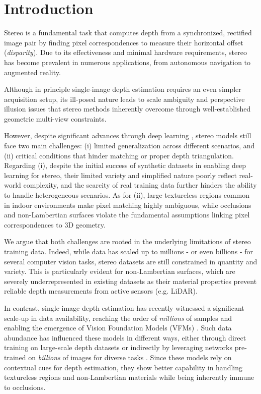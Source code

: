 \section{Introduction}
\label{sec:intro}

Stereo is a fundamental task that computes depth from a synchronized, rectified image pair by finding pixel correspondences to measure their horizontal offset (\textit{disparity}). Due to its effectiveness and minimal hardware requirements, stereo has become prevalent in numerous applications, from autonomous navigation to augmented reality.

Although in principle single-image depth estimation \cite{arampatzakis2023monocular} requires an even simpler acquisition setup, its ill-posed nature leads to scale ambiguity and perspective illusion issues that stereo methods inherently overcome through well-established geometric multi-view constraints.

However, despite significant advances through deep learning \cite{laga2020survey,poggi2021synergies}, stereo models still face two main challenges: (i) limited generalization across different scenarios, and (ii) critical conditions that hinder matching or proper depth triangulation.
Regarding (i), despite the initial success of synthetic datasets in enabling deep learning for stereo, their limited variety and simplified nature poorly reflect real-world complexity, and the scarcity of real training data further hinders the ability to handle heterogeneous scenarios. As for (ii), large textureless regions common in indoor environments make pixel matching highly ambiguous, while occlusions and non-Lambertian surfaces \cite{zamaramirez2022booster,zamaramirez2024booster,wen2024layeredflow} violate the fundamental assumptions linking pixel correspondences to 3D geometry.

We argue that both challenges are rooted in the underlying limitations of stereo training data. Indeed, while data has scaled up to millions - or even billions - for several computer vision tasks, stereo datasets are still constrained in quantity and variety. 
This is particularly evident for non-Lambertian surfaces, which are severely underrepresented in existing datasets as their material properties prevent reliable depth measurements from active sensors (e.g. LiDAR).


In contrast, single-image depth estimation has recently witnessed a significant scale-up in data availability, reaching the order of \textit{millions} of samples and enabling the emergence of Vision Foundation Models (VFMs) \cite{depth_anything_v1,depth_anything_v2,ke2023repurposing,fu2024geowizard}. Such data abundance has influenced these models in different ways, either through direct training on large-scale depth datasets  \cite{depth_anything_v1,depth_anything_v2} or indirectly by leveraging networks pre-trained on \textit{billions} of images for diverse tasks \cite{ke2023repurposing,fu2024geowizard}. 
Since these models rely on contextual cues for depth estimation, they show better capability in handling textureless regions and non-Lambertian materials \cite{roberts2021,Ramirez_2023_CVPR,Ramirez2024,zamaramirez2024tricky} while being inherently immune to occlusions.

